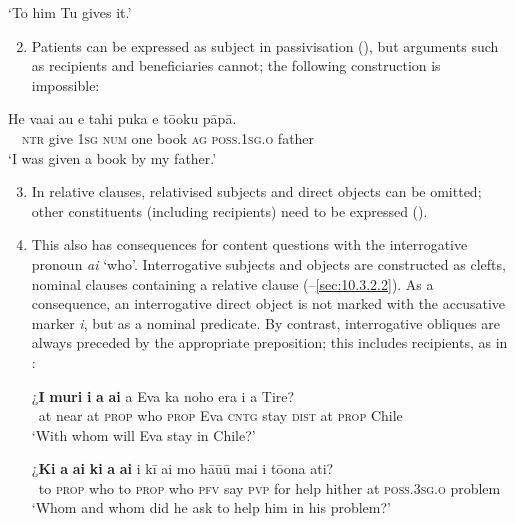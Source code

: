 \glt
‘To him Tu gives it.’ \textstyleExampleref{[R416.080]} 
\z

\begin{enumerate}
\setcounter{enumi}{1}
\item 
Patients can be expressed as subject in passivisation (), but arguments such as recipients and beneficiaries cannot; the following construction is impossible:

\end{enumerate}
\ea\label{ex:8.170}
\gll *He va{\ꞌ}ai au e tahi puka e tō{\ꞌ}oku pāpā.\\
~~\textsc{ntr} give \textsc{1sg} \textsc{num} one book \textsc{ag} \textsc{poss.1sg.o} father\\

\glt
‘I was given a book by my father.’
\z

\begin{enumerate}
\setcounter{enumi}{2}
\item 
In relative clauses, relativised subjects and direct objects can be omitted; other constituents (including recipients) need to be expressed ().

\item 
This also has consequences for content questions with the interrogative pronoun \textit{ai} ‘who’. Interrogative subjects and objects are constructed as clefts, nominal clauses containing a relative clause (–\ref{sec:10.3.2.2}). As a consequence, an interrogative direct object is not marked with the accusative marker \textit{i}, but as a nominal predicate. By contrast, interrogative obliques are always preceded by the appropriate preposition; this includes recipients, as in :

\ea\label{ex:8.171}
\gll ¿\textbf{{\ꞌ}I} \textbf{muri} \textbf{i} \textbf{a} \textbf{ai} a Eva ka noho era {\ꞌ}i a Tire? \\
~at near at \textsc{prop} who \textsc{prop} Eva \textsc{cntg} stay \textsc{dist} at \textsc{prop} Chile \\

\glt 
‘With whom will Eva stay in Chile?’ \textstyleExampleref{[R615.660]}  
\z

\ea\label{ex:8.172}
\gll ¿\textbf{Ki} \textbf{a} \textbf{ai} \textbf{ki} \textbf{a} \textbf{ai} i kī ai mo hā{\ꞌ}ū{\ꞌ}ū mai {\ꞌ}i tō{\ꞌ}ona {\ꞌ}ati? \\
~to \textsc{prop} who to \textsc{prop} who \textsc{pfv} say \textsc{pvp} for help hither at \textsc{poss.3sg.o} problem \\

\glt
‘Whom and whom did he ask to help him in his problem?’ \textstyleExampleref{[R615.145]} 
\z

\end{enumerate}

